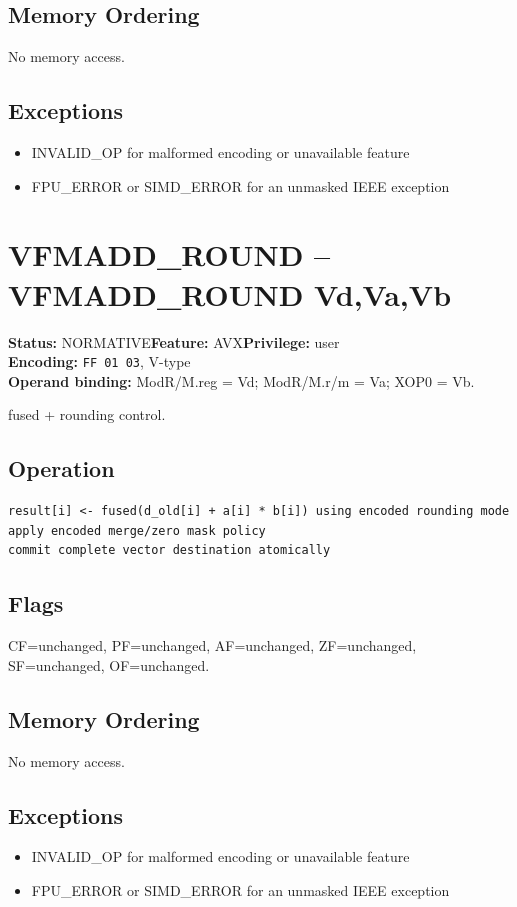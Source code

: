 \documentclass[10pt]{article}
\begin{document}
\subsection*{Memory Ordering}
No memory access.
\subsection*{Exceptions}
\begin{itemize}
\item INVALID\_OP for malformed encoding or unavailable feature
\item FPU\_ERROR or SIMD\_ERROR for an unmasked IEEE exception
\end{itemize}
\clearpage

\section{VFMADD\_ROUND -- VFMADD\_ROUND Vd,Va,Vb}
\textbf{Status:} NORMATIVE\quad \textbf{Feature:} AVX\quad \textbf{Privilege:} user\\
\textbf{Encoding:} \texttt{FF 01 03}, V-type\\
\textbf{Operand binding:} ModR/M.reg = Vd; ModR/M.r/m = Va; XOP0 = Vb.

fused + rounding control.

\subsection*{Operation}
\begin{lstlisting}
result[i] <- fused(d_old[i] + a[i] * b[i]) using encoded rounding mode
apply encoded merge/zero mask policy
commit complete vector destination atomically
\end{lstlisting}
\subsection*{Flags}
CF=unchanged, PF=unchanged, AF=unchanged, ZF=unchanged, SF=unchanged, OF=unchanged.
\subsection*{Memory Ordering}
No memory access.
\subsection*{Exceptions}
\begin{itemize}
\item INVALID\_OP for malformed encoding or unavailable feature
\item FPU\_ERROR or SIMD\_ERROR for an unmasked IEEE exception
\end{itemize}
\clearpage
\end{document}
